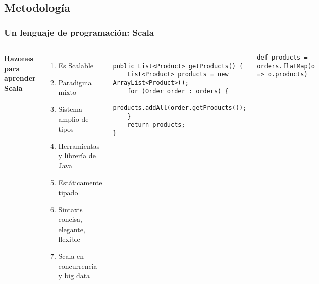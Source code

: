 \documentclass{beamer}
\begin{document}
\subsection{Metodología}
\begin{frame}[fragile]
\frametitle{Un lenguaje de programación: Scala}
\begin{columns}[c] %

\textbf{Razones para aprender Scala}
\begin{enumerate}
\item Es Scalable
\item Paradigma mixto
\item Sistema amplio de tipos
\item Herramientas y librería de Java
\item Estáticamente tipado
\item Sintaxis concisa, elegante, flexible
\item Scala en concurrencia y big data
\end{enumerate}

\begin{example}
\begin{tiny}
\begin{verbatim}

public List<Product> getProducts() {
    List<Product> products = new ArrayList<Product>();
    for (Order order : orders) {
        products.addAll(order.getProducts());
    }
    return products;
}

\end{verbatim}\end{tiny}
\end{example}

\begin{example}
\begin{tiny}
\begin{verbatim}
def products = orders.flatMap(o => o.products)
\end{verbatim}\end{tiny}
\end{example}
\end{columns}
\end{frame}
\end{document}
